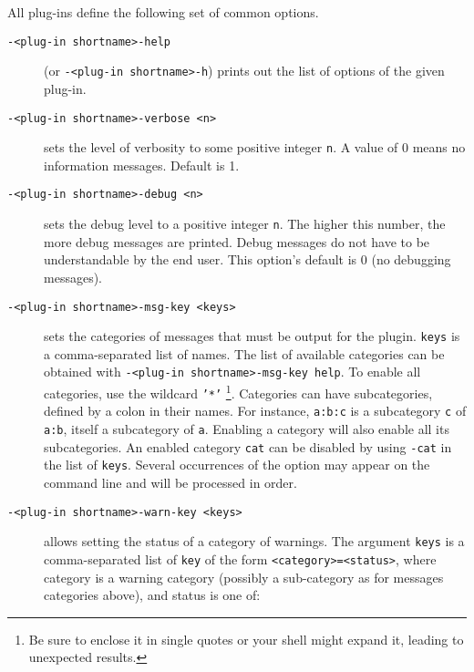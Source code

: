 All \FramaC plug-ins define the following set of common options.
\begin{description}
\item[\texttt{-<plug-in shortname>-help}] (or \texttt{-<plug-in shortname>-h})
  prints out the list of options of the given plug-in.

\item[\texttt{-<plug-in shortname>-verbose <n>}]
 sets the level of verbosity to
  some positive integer \texttt{n}. A value of 0 means no information
  messages. Default is 1.

\item[\texttt{-<plug-in shortname>-debug <n>}]
  sets the debug level to a
  positive integer \texttt{n}. The higher this number, the more debug messages
  are printed. Debug messages do not have to be understandable by the end
  user. This option's default is 0 (no debugging messages).
\item[\texttt{-<plug-in shortname>-msg-key <keys>}]
  sets the categories of
  messages that must be output for the plugin. \texttt{keys} is a 
  comma-separated list of names. The list of available categories can be 
  obtained with \texttt{-<plug-in shortname>-msg-key help}. To enable all
  categories, use the wildcard \texttt{'*'}%
  \footnote{Be sure to enclose it in single quotes or your shell might
    expand it, leading to unexpected results.}. Categories can have 
  subcategories, defined by a colon in their names. For instance, \texttt{a:b:c}
  is a subcategory \texttt{c} of \texttt{a:b}, itself a
  subcategory of \texttt{a}. Enabling a category will also enable all its
  subcategories. An enabled category \texttt{cat} can be disabled by using
  \texttt{-cat} in the list of \texttt{keys}. Several occurrences of the option
  may appear on the command line and will be processed in order.
\item[\texttt{-<plug-in shortname>-warn-key <keys>}]
allows setting the status of a category of warnings. The argument \texttt{keys} is a comma-separated
list of \texttt{key} of the form \texttt{<category>=<status>}, where category is a warning
category (possibly a sub-category as for messages categories above), and status is one of:

\end{description}
